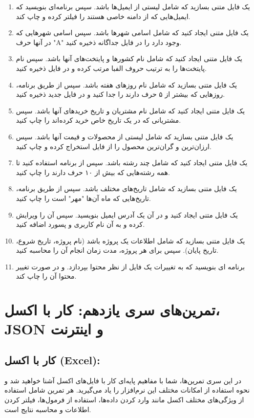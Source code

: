 \documentclass[b5paper,12pt]{article}
\begin{document}
	\begin{enumerate}
		\item یک فایل متنی بسازید که شامل لیستی از ایمیل‌ها باشد. سپس برنامه‌ای بنویسید که ایمیل‌هایی که از دامنه خاصی هستند را فیلتر کرده و چاپ کند.
		\item یک فایل متنی ایجاد کنید که شامل اسامی شهرها باشد. سپس اسامی شهرهایی که در آنها حرف "A" وجود دارد را در فایل جداگانه ذخیره کنید.
		\item یک فایل متنی ایجاد کنید که شامل نام کشورها و پایتخت‌های آنها باشد. سپس نام پایتخت‌ها را به ترتیب حروف الفبا مرتب کرده و در فایل ذخیره کنید.
		\item یک فایل متنی بسازید که شامل نام روزهای هفته باشد. سپس از طریق برنامه، روزهایی که بیشتر از ۵ حرف دارند را جدا کنید و در فایل جدید ذخیره کنید.
		\item یک فایل متنی ایجاد کنید که شامل نام مشتریان و تاریخ خریدهای آنها باشد. سپس مشتریانی که در یک تاریخ خاص خرید کرده‌اند را چاپ کنید.
		\item یک فایل متنی بسازید که شامل لیستی از محصولات و قیمت آنها باشد. سپس ارزان‌ترین و گران‌ترین محصول را از فایل استخراج کرده و چاپ کنید.
		\item یک فایل متنی ایجاد کنید که شامل چند رشته باشد. سپس از برنامه استفاده کنید تا همه رشته‌هایی که بیش از ۱۰ حرف دارند را چاپ کنید.
		\item یک فایل متنی بسازید که شامل تاریخ‌های مختلف باشد. سپس از طریق برنامه، تاریخ‌هایی که ماه آن‌ها "مهر" است را چاپ کنید.
		\item یک فایل متنی ایجاد کنید و در آن یک آدرس ایمیل بنویسید. سپس آن را ویرایش کرده و به آن نام کاربری و پسورد اضافه کنید.
		\item یک فایل متنی بسازید که شامل اطلاعات یک پروژه باشد (نام پروژه، تاریخ شروع، تاریخ پایان). سپس برای هر پروژه، مدت زمان انجام آن را محاسبه کنید.
		\item برنامه ای بنویسید که به تغییرات یک فایل از نظر محتوا بپردازد. و در صورت تغییر محتوا آن را چاپ کند.
	\end{enumerate}
	

	\newpage
	\section*{تمرین‌های سری یازدهم: کار با اکسل، JSON و اینترنت}
	
	\subsection*{کار با اکسل (Excel):}
	در این سری تمرین‌ها، شما با مفاهیم پایه‌ای کار با فایل‌های اکسل آشنا خواهید شد و نحوه استفاده از امکانات مختلف این نرم‌افزار را یاد می‌گیرید. هر تمرین شامل استفاده از ویژگی‌های مختلف اکسل مانند وارد کردن داده‌ها، استفاده از فرمول‌ها، فیلتر کردن اطلاعات و محاسبه نتایج است.
\end{document}
